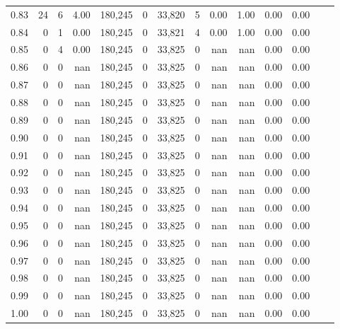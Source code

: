 \begin{tabular}{rrrrrrrrrrrrrr}
0.83 &     24 &      6 &    4.00 &  180,245 &        0 &  33,820 &       5 &  0.00 &  1.00 &  0.00 &      0.00 \\
0.84 &      0 &      1 &    0.00 &  180,245 &        0 &  33,821 &       4 &  0.00 &  1.00 &  0.00 &      0.00 \\
0.85 &      0 &      4 &    0.00 &  180,245 &        0 &  33,825 &       0 &   nan &   nan &  0.00 &      0.00 \\
0.86 &      0 &      0 &     nan &  180,245 &        0 &  33,825 &       0 &   nan &   nan &  0.00 &      0.00 \\
0.87 &      0 &      0 &     nan &  180,245 &        0 &  33,825 &       0 &   nan &   nan &  0.00 &      0.00 \\
0.88 &      0 &      0 &     nan &  180,245 &        0 &  33,825 &       0 &   nan &   nan &  0.00 &      0.00 \\
0.89 &      0 &      0 &     nan &  180,245 &        0 &  33,825 &       0 &   nan &   nan &  0.00 &      0.00 \\
0.90 &      0 &      0 &     nan &  180,245 &        0 &  33,825 &       0 &   nan &   nan &  0.00 &      0.00 \\
0.91 &      0 &      0 &     nan &  180,245 &        0 &  33,825 &       0 &   nan &   nan &  0.00 &      0.00 \\
0.92 &      0 &      0 &     nan &  180,245 &        0 &  33,825 &       0 &   nan &   nan &  0.00 &      0.00 \\
0.93 &      0 &      0 &     nan &  180,245 &        0 &  33,825 &       0 &   nan &   nan &  0.00 &      0.00 \\
0.94 &      0 &      0 &     nan &  180,245 &        0 &  33,825 &       0 &   nan &   nan &  0.00 &      0.00 \\
0.95 &      0 &      0 &     nan &  180,245 &        0 &  33,825 &       0 &   nan &   nan &  0.00 &      0.00 \\
0.96 &      0 &      0 &     nan &  180,245 &        0 &  33,825 &       0 &   nan &   nan &  0.00 &      0.00 \\
0.97 &      0 &      0 &     nan &  180,245 &        0 &  33,825 &       0 &   nan &   nan &  0.00 &      0.00 \\
0.98 &      0 &      0 &     nan &  180,245 &        0 &  33,825 &       0 &   nan &   nan &  0.00 &      0.00 \\
0.99 &      0 &      0 &     nan &  180,245 &        0 &  33,825 &       0 &   nan &   nan &  0.00 &      0.00 \\
1.00 &      0 &      0 &     nan &  180,245 &        0 &  33,825 &       0 &   nan &   nan &  0.00 &      0.00 \\
\bottomrule
\end{tabular}
